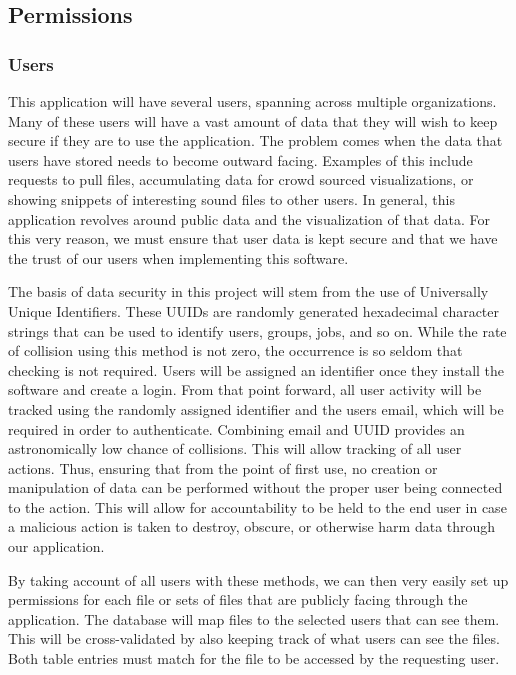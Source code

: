 \subsection{Permissions}
\subsubsection{Users}
This application will have several users, spanning across multiple organizations. Many of these users will have a vast amount of data that they will wish to keep secure if they are to use the application. The problem comes when the data that users have stored needs to become outward facing. Examples of this include requests to pull files, accumulating data for crowd sourced visualizations, or showing snippets of interesting sound files to other users. In general, this application revolves around public data and the visualization of that data. For this very reason, we must ensure that user data is kept secure and that we have the trust of our users when implementing this software.\par
The basis of data security in this project will stem from the use of Universally Unique Identifiers. These UUID\textquotesingle s are randomly generated hexadecimal character strings that can be used to identify users, groups, jobs, and so on. While the rate of collision using this method is not zero, the occurrence is so seldom that checking is not required. Users will be assigned an identifier once they install the software and create a login. From that point forward, all user activity will be tracked using the randomly assigned identifier and the user\textquotesingle s email, which will be required in order to authenticate. Combining email and UUID provides an astronomically low chance of collisions. This will allow tracking of all user actions. Thus, ensuring that from the point of first use, no creation or manipulation of data can be performed without the proper user being connected to the action. This will allow for accountability to be held to the end user in case a malicious action is taken to destroy, obscure, or otherwise harm data through our application.\par
By taking account of all users with these methods, we can then very easily set up permissions for each file or sets of files that are publicly facing through the application. The database will map files to the selected users that can see them. This will be cross-validated by also keeping track of what users can see the files. Both table entries must match for the file to be accessed by the requesting user.

